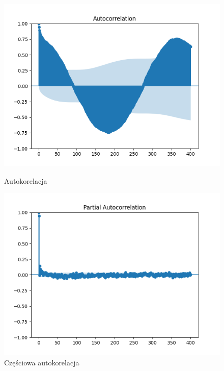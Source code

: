 \documentclass{article}
\theoremstyle{break}
\begin{document}
	\begin{figure}[H]
	\begin{center}
		\begin{minipage}{0.49\linewidth}
			\centering
			\includegraphics[scale=0.49]{acf1.png}
			\caption{Autokorelacja}
			\label{fig:acf1}
		\end{minipage}
		\begin{minipage}{0.49\linewidth}
			\centering
			\includegraphics[scale=0.49]{pacf1.png}
			\caption{Częściowa autokorelacja}
			\label{fig:pacf1}
		\end{minipage}
	\end{center}
\end{figure}
\end{document}
